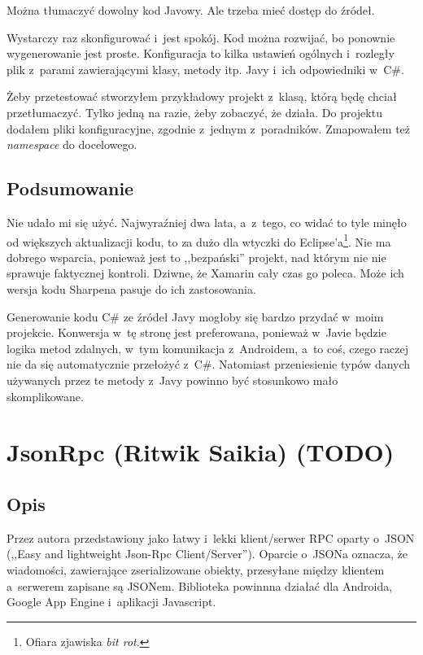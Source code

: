 \begin{description}
Można tłumaczyć dowolny kod Javowy. Ale trzeba mieć dostęp do źródeł.

Wystarczy raz skonfigurować i~jest spokój. Kod można rozwijać, bo ponownie wygenerowanie jest proste.
Konfiguracja to kilka ustawień ogólnych i~rozległy plik z~parami zawierającymi klasy, metody itp. Javy i~ich odpowiedniki w~C\#.

Żeby przetestować stworzyłem przykładowy projekt z~klasą, którą będę chciał przetłumaczyć. Tylko jedną na razie, żeby zobaczyć, że działa.
Do projektu dodałem pliki konfiguracyjne, zgodnie z~jednym z~poradników. Zmapowałem też \emph{namespace} do docelowego.
\end{description}

\subsection{Podsumowanie}
Nie udało mi się użyć. Najwyraźniej dwa lata, a~z~tego, co widać to tyle minęło od większych aktualizacji kodu, to za dużo dla wtyczki do Eclipse'a\footnote{Ofiara zjawiska \emph{bit rot}.}.
Nie ma dobrego wsparcia, ponieważ jest to ,,bezpański'' projekt, nad którym nie nie sprawuje faktycznej kontroli.
Dziwne, że Xamarin cały czas go poleca. Może ich wersja kodu Sharpena pasuje do ich zastosowania.

Generowanie kodu C\# ze źródeł Javy mogłoby się bardzo przydać w~moim projekcie. Konwersja w~tę stronę jest preferowana, ponieważ w~Javie będzie logika metod zdalnych, w~tym komunikacja z~Androidem, a~to coś, czego raczej nie da się automatycznie przełożyć z~C\#.
Natomiast przeniesienie typów danych używanych przez te metody z~Javy powinno być stosunkowo mało skomplikowane.



\section{JsonRpc (Ritwik Saikia) (TODO)}
\subsection{Opis}
Przez autora przedstawiony jako łatwy i~lekki klient/serwer RPC oparty o~JSON (,,Easy and lightweight Json-Rpc Client/Server'')\cite{json-rpc-lib}.
Oparcie o~JSONa oznacza, że wiadomości, zawierające zserializowane obiekty, przesyłane między klientem a~serwerem zapisane są JSONem. Biblioteka powinnna działać dla Androida, Google App Engine i~aplikacji Javascript.

